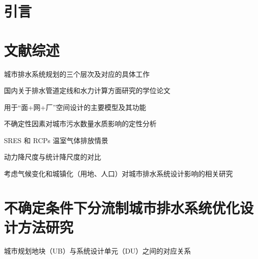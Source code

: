 \documentclass[degree=doctor]{sysuthesis}
\begin{document}
\START


\frontmatter
\setcounter{page}{3}
\showoutput
\listoftables
\clearpage
\OMIT


\mainmatter
\chapter{引言}


\chapter{文献综述}

\clearpage
\setcounter{page}{13}
\begin{table}
  \centering
  \caption{城市排水系统规划的三个层次及对应的具体工作}
\end{table}

\clearpage
\setcounter{page}{25}
\begin{table}
  \centering
  \caption{国内关于排水管道定线和水力计算方面研究的学位论文}
\end{table}

\clearpage
\setcounter{page}{26}
\begin{table}
  \centering
  \caption{用于“面+网+厂”空间设计的主要模型及其功能}
\end{table}

\clearpage
\setcounter{page}{28}
\begin{table}
  \centering
  \caption{不确定性因素对城市污水数量水质影响的定性分析}
\end{table}

\clearpage
\setcounter{page}{35}
\begin{table}
  \centering
  \caption{SRES 和 RCPs 温室气体排放情景}
\end{table}

\clearpage
\setcounter{page}{36}
\begin{table}
  \centering
  \caption{动力降尺度与统计降尺度的对比}
\end{table}

\begin{table}
  \centering
  \caption{考虑气候变化和城镇化（用地、人口）对城市排水系统设计影响的相关研究}
\end{table}


\chapter{不确定条件下分流制城市排水系统优化设计方法研究}

\clearpage
\setcounter{page}{45}
\begin{table}
  \centering
  \caption{城市规划地块（UB）与系统设计单元（DU）之间的对应关系}
\end{table}
\end{document}
